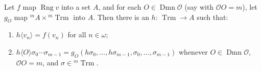 Let $f$ map $\operatorname{Rng} v$ into a set $A$, and for each $O \in \operatorname{Dmn} \mathcal{O}$ (say with $\mathcal{O}O = m$), let $g_O$ map ${}^m A \times {}^m \operatorname{Trm}$ into $A$. Then there is an $h$: $\operatorname{Trm} \to A$ such that:
\begin{enumerate}
\item[(i)] $h\langle v_n \rangle = f(v_n)$ for all $n \in \omega$;
\item[(ii)] $h\langle O \rangle \sigma_0 \cdots \sigma_{m-1} = g_O(h\sigma_0, \ldots, h\sigma_{m-1}, \sigma_0, \ldots, \sigma_{m-1})$ whenever $O \in \operatorname{Dmn} \mathcal{O}$, $\mathcal{O}O = m$, and $\sigma \in {}^m \operatorname{Trm}$.
\end{enumerate}
